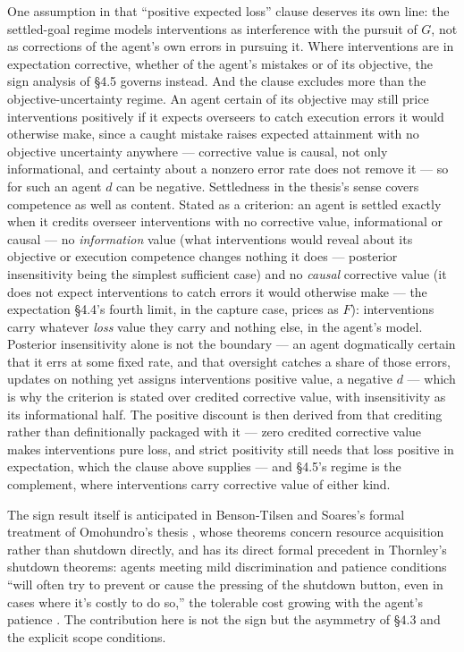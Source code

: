 \documentclass[11pt]{article}
\theoremstyle{definition}
\begin{document}
One assumption in that ``positive expected loss'' clause deserves its own line: the settled-goal regime models interventions as interference with the pursuit of $G$, not as corrections of the agent's own errors in pursuing it. Where interventions are in expectation corrective, whether of the agent's mistakes or of its objective, the sign analysis of \S4.5 governs instead. And the clause excludes more than the objective-uncertainty regime. An agent certain of its objective may still price interventions positively if it expects overseers to catch execution errors it would otherwise make, since a caught mistake raises expected attainment with no objective uncertainty anywhere --- corrective value is causal, not only informational, and certainty about a nonzero error rate does not remove it --- so for such an agent $d$ can be negative. Settledness in the thesis's sense covers competence as well as content. Stated as a criterion: an agent is settled exactly when it credits overseer interventions with no corrective value, informational or causal --- no \emph{information} value (what interventions would reveal about its objective or execution competence changes nothing it does --- posterior insensitivity being the simplest sufficient case) and no \emph{causal} corrective value (it does not expect interventions to catch errors it would otherwise make --- the expectation \S4.4's fourth limit, in the capture case, prices as $F$): interventions carry whatever \emph{loss} value they carry and nothing else, in the agent's model. Posterior insensitivity alone is not the boundary --- an agent dogmatically certain that it errs at some fixed rate, and that oversight catches a share of those errors, updates on nothing yet assigns interventions positive value, a negative $d$ --- which is why the criterion is stated over credited corrective value, with insensitivity as its informational half. The positive discount is then derived from that crediting rather than definitionally packaged with it --- zero credited corrective value makes interventions pure loss, and strict positivity still needs that loss positive in expectation, which the clause above supplies --- and \S4.5's regime is the complement, where interventions carry corrective value of either kind.

The sign result itself is anticipated in Benson-Tilsen and Soares's formal treatment of Omohundro's thesis \cite{bensontilsen2016formalizing}, whose theorems concern resource acquisition rather than shutdown directly, and has its direct formal precedent in Thornley's shutdown theorems: agents meeting mild discrimination and patience conditions ``will often try to prevent or cause the pressing of the shutdown button, even in cases where it's costly to do so,'' the tolerable cost growing with the agent's patience \cite{thornley2025shutdown}. The contribution here is not the sign but the asymmetry of \S4.3 and the explicit scope conditions.
\end{document}
